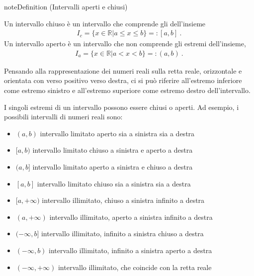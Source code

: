 \documentclass[letterpaper,10pt,italian]{jupyterBook}
\begin{document}
\label{None:interval-open-close}
\begin{sphinxadmonition}{note}{Definition  (Intervalli aperti e chiusi)}



\sphinxAtStartPar
Un intervallo chiuso è un intervallo che comprende gli  dell’insieme
\begin{equation*}
\begin{split}I_c = \{ x \in \mathbb{R} | a \le x \le b \} =: [a,b] \ .\end{split}
\end{equation*}
\sphinxAtStartPar
Un intervallo aperto è un intervallo che non comprende gli  estremi dell’insieme,
\begin{equation*}
\begin{split}I_a = \{ x \in \mathbb{R} | a < x < b \} =: (a,b) \ .\end{split}
\end{equation*}\end{sphinxadmonition}

\sphinxAtStartPar
Pensando alla rappresentazione dei numeri reali sulla retta reale, orizzontale e orientata con verso positivo verso destra, ci si può riferire all’estremo inferiore come estremo sinistro e all’estremo superiore come estremo destro dell’intervallo.

\sphinxAtStartPar
I singoli estremi di un intervallo possono essere chiusi o aperti. Ad esempio, i possibili intervalli di numeri reali sono:
\begin{itemize}
\item {} 
\sphinxAtStartPar
\((a,b)\) intervallo limitato aperto sia a sinistra sia a destra

\item {} 
\sphinxAtStartPar
\([a,b)\) intervallo limitato chiuso a sinistra e aperto a destra

\item {} 
\sphinxAtStartPar
\((a,b]\) intervallo limitato aperto a sinistra e chiuso a destra

\item {} 
\sphinxAtStartPar
\([a,b]\) intervallo limitato chiuso sia a sinistra sia a destra

\item {} 
\sphinxAtStartPar
\([a,+\infty)\) intervallo illimitato, chiuso a sinistra infinito a destra

\item {} 
\sphinxAtStartPar
\((a,+\infty)\) intervallo illimitato, aperto a sinistra infinito a destra

\item {} 
\sphinxAtStartPar
\((-\infty,b]\) intervallo illimitato, infinito a sinistra chiuso a destra

\item {} 
\sphinxAtStartPar
\((-\infty,b)\) intervallo illimitato, infinito a sinistra aperto a destra

\item {} 
\sphinxAtStartPar
\((-\infty,+\infty)\) intervallo illimitato, che coincide con la retta reale

\end{itemize}
\end{document}
